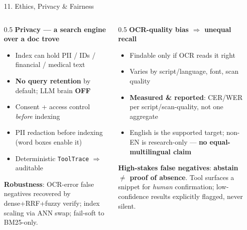 \documentclass[10pt,aspectratio=169]{beamer}
\begin{document}
\begin{frame}{11. Ethics, Privacy \& Fairness}
\begin{columns}[T]
\begin{column}{0.5\textwidth}
\textbf{Privacy --- a search engine over a doc trove}
\begin{itemize}\small
  \item Index can hold PII / IDs / financial / medical text
  \item \textbf{No query retention} by default; LLM brain \textbf{OFF}
  \item Consent + access control \emph{before} indexing
  \item PII redaction before indexing (word boxes enable it)
  \item Deterministic \texttt{ToolTrace} $\Rightarrow$ auditable
\end{itemize}
\textbf{Robustness}: OCR-error false negatives recovered by dense+RRF+fuzzy verify; index scaling via ANN swap; fail-soft to BM25-only.
\end{column}
\begin{column}{0.5\textwidth}
\textbf{OCR-quality bias $\Rightarrow$ unequal recall}
\begin{itemize}\small
  \item Findable only if OCR reads it right
  \item Varies by script/language, font, scan quality
  \item \textbf{Measured \& reported}: CER/WER per script/scan-quality, not one aggregate
  \item English is the supported target; non-EN is research-only --- \textbf{no equal-multilingual claim}
\end{itemize}
\textbf{High-stakes false negatives}: \textbf{abstain $\ne$ proof of absence}. Tool surfaces a snippet for \emph{human} confirmation; low-confidence results explicitly flagged, never silent.
\end{column}
\end{columns}
\end{frame}
\end{document}
